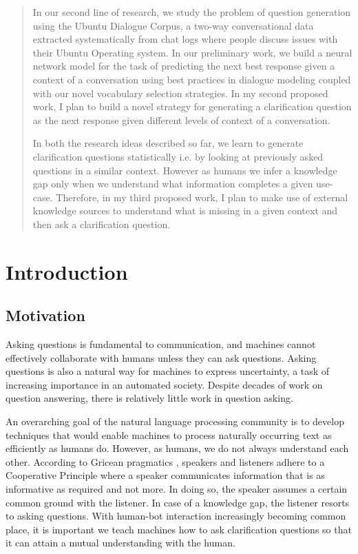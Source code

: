 \documentclass[11pt]{report}
\numberwithin{equation}{section}
\begin{document}
\begin{abstract}
In our second line of research, we study the problem of question generation using the Ubuntu Dialogue Corpus, a two-way conversational data extracted systematically from chat logs where people discuss issues with their Ubuntu Operating system. In our preliminary work, we build a neural network model for the task of predicting the next best response given a context of a conversation using best practices in dialogue modeling coupled with our novel vocabulary selection strategies. In my second proposed work, I plan to build a novel strategy for generating a clarification question as the next response given different levels of context of a conversation. 

In both the research ideas described so far, we learn to generate clarification questions statistically i.e. by looking at previously asked questions in a similar context. However as humans we infer a knowledge gap only when we understand what information completes a given use-case. Therefore, in my third proposed work, I plan to make use of external knowledge sources to understand what is missing in a given context and then ask a clarification question.  

\end{abstract}

\pagebreak


\tableofcontents
\pagebreak

\cleardoublepage
{}


\chapter{Introduction}

\section{Motivation}

Asking questions is fundamental to communication, and machines cannot effectively collaborate with humans unless they can ask questions. Asking questions is also a natural way for machines to express uncertainty, a task of increasing importance in an automated society. Despite decades of work on question answering, there is relatively little work in question asking.

An overarching goal of the natural language processing community is to develop techniques that would enable machines to process naturally occurring text as efficiently as humans do. However, as humans, we do not always understand each other. According to Gricean pragmatics \cite{grice1975logic}, speakers and listeners adhere to a Cooperative Principle where a speaker communicates information that is as informative as required and not more. In doing so, the speaker assumes a certain common ground with the listener. In case of a knowledge gap, the listener resorts to asking questions. With human-bot interaction increasingly becoming common place, it is important we teach machines how to ask clarification questions so that it can attain a mutual understanding with the human. 
\end{document}

